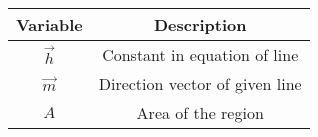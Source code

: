 \begin{tabular}[12pt]{ |c|c|}
    \hline
    \textbf{Variable} & \textbf{Description}\\ 
    \hline
    $\vec{h}$ & Constant in equation of line\\
    \hline
    $\vec{m}$ & Direction vector of given line\\
    \hline
    $A$ & Area of the region\\
    \hline
    \end{tabular}
